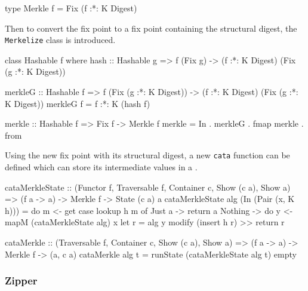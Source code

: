 \begin{haskell}
type Merkle f = Fix (f :*: K Digest)
\end{haskell}

Then to convert the fix point to a fix point containing the structural digest, the \texttt{Merkelize} class is introduced. 

\begin{haskell}
class Hashable f where
    hash :: Hashable g => f (Fix g) -> (f :*: K Digest) (Fix (g :*: K Digest))

merkleG :: Hashable f 
        => f (Fix (g :*: K Digest)) -> (f :*: K Digest) (Fix (g :*: K Digest))
merkleG f = f :*: K (hash f)

merkle :: Hashable f => Fix f -> Merkle f
merkle = In . merkleG . fmap merkle . from
\end{haskell}

Using the new fix point with its structural digest, a new \texttt{cata} function can be defined which can store its intermediate values in a . 

\begin{haskell}
cataMerkleState :: (Functor f, Traversable f, Container c, Show (c a), Show a)
                => (f a -> a) -> Merkle f -> State (c a) a
cataMerkleState alg (In (Pair (x, K h))) = do m <- get
  case lookup h m of
    Just a  -> return a
    Nothing -> do y <- mapM (cataMerkleState alg) x
               let r = alg y
               modify (insert h r) >> return r

cataMerkle :: (Traversable f, Container c, Show (c a), Show a)
           => (f a -> a) -> Merkle f -> (a, c a)
cataMerkle alg t = runState (cataMerkleState alg t) empty
\end{haskell}

\subsubsection{Zipper}
